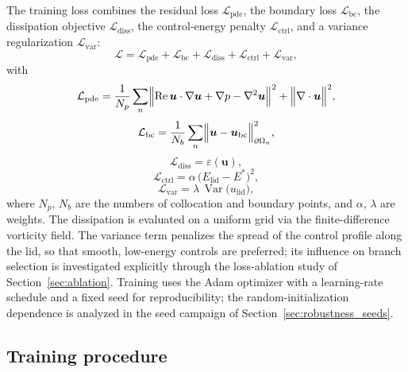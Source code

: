 \documentclass[aip,pof,reprint,superscriptaddress]{revtex4-2}
\newcommand{\re}{\mathrm{Re}}
\begin{document}
The training loss combines the residual loss $\mathcal{L}_{\mathrm{pde}}$, the boundary loss $\mathcal{L}_{\mathrm{bc}}$, the dissipation objective $\mathcal{L}_{\mathrm{diss}}$, the control-energy penalty $\mathcal{L}_{\mathrm{ctrl}}$, and a variance regularization $\mathcal{L}_{\mathrm{var}}$:
\begin{equation}\label{eq:loss}
\mathcal{L}=\mathcal{L}_{\mathrm{pde}}+\mathcal{L}_{\mathrm{bc}}+\mathcal{L}_{\mathrm{diss}}+\mathcal{L}_{\mathrm{ctrl}}+\mathcal{L}_{\mathrm{var}},
\end{equation}
with
\begin{equation}\label{eq:lpde}
\mathcal{L}_{\mathrm{pde}}=\frac{1}{N_p}\sum_{n}\Bigl\|\re\,\bm u\cdot\nabla\bm u+\nabla p-\nabla^2\bm u\Bigr\|^2+\Bigl\|\nabla\cdot\bm u\Bigr\|^2,
\end{equation}
\begin{equation}\label{eq:lbc}
\mathcal{L}_{\mathrm{bc}}=\frac{1}{N_b}\sum_{n}\Bigl\|\bm u-\bm u_{\mathrm{bc}}\Bigr\|^2_{\partial\Omega_n},
\end{equation}
\begin{equation}\label{eq:ldiss}
\mathcal{L}_{\mathrm{diss}}=\varepsilon(\bm u),
\end{equation}
\begin{equation}\label{eq:lctrl}
\mathcal{L}_{\mathrm{ctrl}}=\alpha\,\bigl(E_{\mathrm{lid}}-E^*\bigr)^2,
\end{equation}
\begin{equation}\label{eq:lvar}
\mathcal{L}_{\mathrm{var}}=\lambda\,\operatorname{Var}\bigl(u_{\mathrm{lid}}\bigr),
\end{equation}
where $N_p$, $N_b$ are the numbers of collocation and boundary points, and $\alpha$, $\lambda$ are weights. The dissipation is evaluated on a uniform grid via the finite-difference vorticity field. The variance term penalizes the spread of the control profile along the lid, so that smooth, low-energy controls are preferred; its influence on branch selection is investigated explicitly through the loss-ablation study of Section~\ref{sec:ablation}. Training uses the Adam optimizer \cite{kingma2015adam} with a learning-rate schedule and a fixed seed for reproducibility; the random-initialization dependence is analyzed in the seed campaign of Section~\ref{sec:robustness_seeds}.

\subsection{Training procedure}
\end{document}
